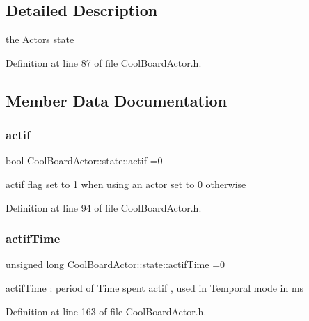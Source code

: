 \subsection{Detailed Description}
the Actor\textquotesingle{}s state 

Definition at line 87 of file Cool\+Board\+Actor.\+h.



\subsection{Member Data Documentation}
\mbox{\label{struct_cool_board_actor_1_1state_a7963178c2de01ef0d2861f9f59ad6f3c}} 
\subsubsection{\texorpdfstring{actif}{actif}}
{\footnotesize\ttfamily bool Cool\+Board\+Actor\+::state\+::actif =0}

actif flag set to 1 when using an actor set to 0 otherwise 

Definition at line 94 of file Cool\+Board\+Actor.\+h.

\mbox{\label{struct_cool_board_actor_1_1state_a534119a22a09b29ecb446b277d5b2ef5}} 
\subsubsection{\texorpdfstring{actif\+Time}{actifTime}}
{\footnotesize\ttfamily unsigned long Cool\+Board\+Actor\+::state\+::actif\+Time =0}

actif\+Time \+: period of Time spent actif , used in Temporal mode in ms 

Definition at line 163 of file Cool\+Board\+Actor.\+h.

\mbox{\label{struct_cool_board_actor_1_1state_acd1af3ac2382258a5b05497d814adc01}} 
